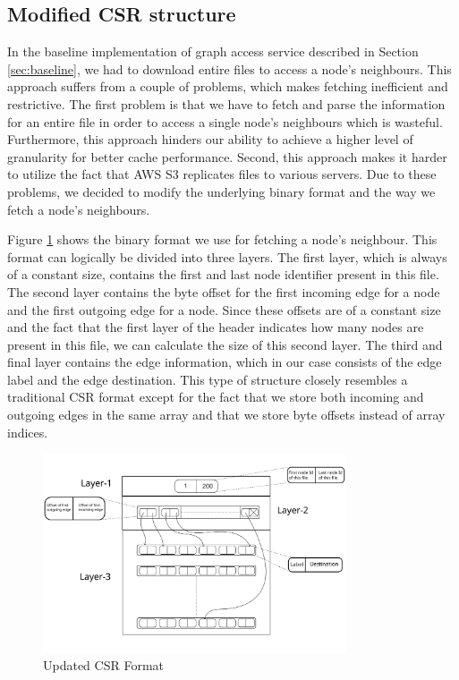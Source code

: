 \subsection{Modified CSR structure}\label{sec:modifiedCsr}
In the baseline implementation of graph access service described in
Section \ref{sec:baseline}, we had to download entire files to access
a node's neighbours. This approach suffers from a couple of problems, which makes
fetching inefficient and restrictive. The first problem is that we have to
fetch and parse the information for an entire file in order to access a single
node's neighbours which is wasteful. Furthermore, this approach hinders our
ability to achieve a  higher level of granularity for better cache performance.
Second, this approach makes it harder to utilize the fact that AWS S3 replicates
files to various servers. Due to these problems, we decided to modify the
underlying binary format and the way we fetch a node's neighbours.

\medskip
Figure \ref{fig:csrFormat} shows the binary format we use for fetching a
node's neighbour. This format can logically be divided into three layers. The
first layer, which is always of a constant size, contains the first and last
node identifier present in this file. The second layer contains the byte offset
for the first incoming edge for a node and the first outgoing edge for a node.
Since these offsets are of a constant size and the fact that the first layer of
the header indicates how many nodes are present in this file, we can calculate
the size of this second layer. The third and final layer contains the edge
information, which in our case consists of the edge label and the edge
destination. This type of structure closely resembles a traditional CSR format
except for the fact that we store both incoming and outgoing edges in the same
array and that we store byte offsets instead of array indices.
\begin{figure}[ht]
    \centering
    \includegraphics[width=0.8\textwidth]{figures/csrFormat.png}
    \caption{Updated CSR Format}
    \label{fig:csrFormat}
\end{figure}

